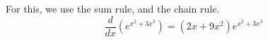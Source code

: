For this, we use the sum rule, and the chain rule.
$$
\frac{d}{dx}(e^{x^2+3x^3})=(2x+9x^2)e^{x^2+3x^3}
$$